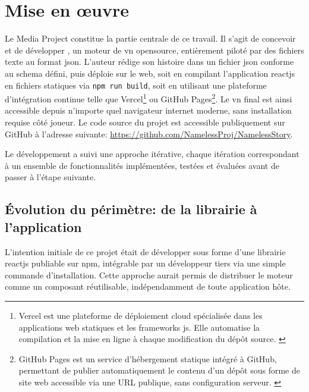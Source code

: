 \section{Mise en \oe{}uvre} \label{chap:MediaProject}

Le Media Project constitue la partie centrale de ce travail. Il s'agit de concevoir et de développer \textbf{\ns}, un moteur de \gls{vn} \gls{opensource}, entièrement piloté par des fichiers texte au format \gls{json}. L'auteur rédige son histoire dans un fichier \gls{json} conforme au \gls{schema} défini, puis déploie sur le web, soit en compilant l'application \gls{reactjs} en fichiers statiques via \texttt{npm run build}, soit en utilisant une plateforme d'intégration continue telle que Vercel\footnote{Vercel est une plateforme de déploiement cloud spécialisée dans les applications web statiques et les frameworks \gls{js}. Elle automatise la compilation et la mise en ligne à chaque modification du dépôt source. \parencite{noauthor_vercel_nodate}} ou GitHub Pages\footnote{GitHub Pages est un service d'hébergement statique intégré à GitHub, permettant de publier automatiquement le contenu d'un dépôt sous forme de site web accessible via une URL publique, sans configuration serveur. \parencite{noauthor_documentation_nodate}}. Le \gls{vn} final est ainsi accessible depuis n'importe quel navigateur internet moderne, sans installation requise côté joueur. Le code source du projet est accessible publiquement sur GitHub à l'adresse suivante: \url{https://github.com/NamelessProj/NamelessStory}.

Le développement a suivi une approche itérative, chaque itération correspondant à un ensemble de fonctionnalités implémentées, testées et évaluées avant de passer à l'étape suivante.


\subsection{Évolution du périmètre: de la librairie à l'application} 

L'intention initiale de ce projet était de développer \nsits sous forme d'une \gls{librairie} \gls{reactjs} publiable sur \gls{npm}, intégrable par un développeur tiers via une simple commande d'installation. Cette approche aurait permis de distribuer le moteur comme un composant réutilisable, indépendamment de toute application hôte.

